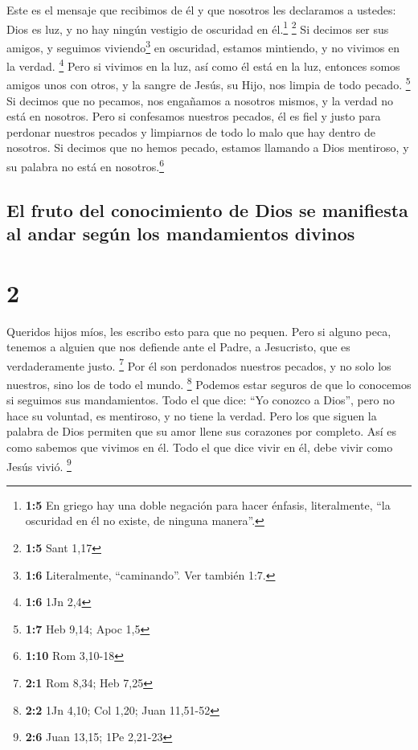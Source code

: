  Este es el mensaje que recibimos de él y que nosotros les
declaramos a ustedes: Dios es luz, y no hay ningún vestigio de oscuridad
en él.\footnote{\textbf{1:5} En griego hay una doble negación para hacer
  énfasis, literalmente, ``la oscuridad en él no existe, de ninguna
  manera''.} \footnote{\textbf{1:5} Sant 1,17}  Si decimos
ser sus amigos, y seguimos viviendo\footnote{\textbf{1:6} Literalmente,
  ``caminando''. Ver también 1:7.} en oscuridad, estamos mintiendo, y no
vivimos en la verdad. \footnote{\textbf{1:6} 1Jn 2,4} 
Pero si vivimos en la luz, así como él está en la luz, entonces somos
amigos unos con otros, y la sangre de Jesús, su Hijo, nos limpia de todo
pecado. \footnote{\textbf{1:7} Heb 9,14; Apoc 1,5}  Si
decimos que no pecamos, nos engañamos a nosotros mismos, y la verdad no
está en nosotros.  Pero si confesamos nuestros pecados, él
es fiel y justo para perdonar nuestros pecados y limpiarnos de todo lo
malo que hay dentro de nosotros.  Si decimos que no hemos
pecado, estamos llamando a Dios mentiroso, y su palabra no está en
nosotros.\footnote{\textbf{1:10} Rom 3,10-18}

\hypertarget{el-fruto-del-conocimiento-de-dios-se-manifiesta-al-andar-seguxfan-los-mandamientos-divinos}{%
\subsection{El fruto del conocimiento de Dios se manifiesta al andar
según los mandamientos
divinos}\label{el-fruto-del-conocimiento-de-dios-se-manifiesta-al-andar-seguxfan-los-mandamientos-divinos}}

\hypertarget{section-1}{%
\section{2}\label{section-1}}

 Queridos hijos míos, les escribo esto para que no pequen.
Pero si alguno peca, tenemos a alguien que nos defiende ante el Padre, a
Jesucristo, que es verdaderamente justo. \footnote{\textbf{2:1} Rom
  8,34; Heb 7,25}  Por él son perdonados nuestros pecados,
y no solo los nuestros, sino los de todo el mundo. \footnote{\textbf{2:2}
  1Jn 4,10; Col 1,20; Juan 11,51-52}  Podemos estar
seguros de que lo conocemos si seguimos sus mandamientos. 
Todo el que dice: ``Yo conozco a Dios'', pero no hace su voluntad, es
mentiroso, y no tiene la verdad.  Pero los que siguen la
palabra de Dios permiten que su amor llene sus corazones por completo.
Así es como sabemos que vivimos en él.  Todo el que dice
vivir en él, debe vivir como Jesús vivió. \footnote{\textbf{2:6} Juan
  13,15; 1Pe 2,21-23}

